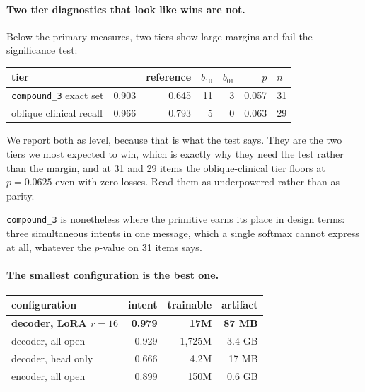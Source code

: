 \paragraph{Two tier diagnostics that look like wins are not.} Below the
primary measures, two tiers show large margins and fail the significance
test:

\begin{center}
\begin{tabular}{lrrrrrl}
\toprule
tier & \openjev{} & reference & $b_{10}$ & $b_{01}$ & $p$ & $n$ \\
\midrule
\texttt{compound\_3} exact set & 0.903 & 0.645 & 11 & 3 & 0.057 & 31 \\
oblique clinical recall        & 0.966 & 0.793 &  5 & 0 & 0.063 & 29 \\
\bottomrule
\end{tabular}
\end{center}

We report both as level, because that is what the test says. They are the
two tiers we most expected to win, which is exactly why they need the test
rather than the margin, and at 31 and 29 items the oblique-clinical tier
floors at $p = 0.0625$ even with zero losses. Read them as underpowered
rather than as parity.

\texttt{compound\_3} is nonetheless where the \noul{} primitive earns its
place in design terms: three simultaneous intents in one message, which a
single \choice{} softmax cannot express at all, whatever the $p$-value on
31 items says.

\paragraph{The smallest configuration is the best one.}

\begin{center}
\begin{tabular}{lrrr}
\toprule
configuration & intent & trainable & artifact \\
\midrule
\textbf{decoder, LoRA $r{=}16$} & \textbf{0.979} & \textbf{17M} & \textbf{87 MB} \\
decoder, all open            & 0.929 & 1{,}725M & 3.4 GB \\
decoder, head only           & 0.666 & 4.2M & 17 MB \\
encoder, all open            & 0.899 & 150M & 0.6 GB \\
\bottomrule
\end{tabular}
\end{center}

